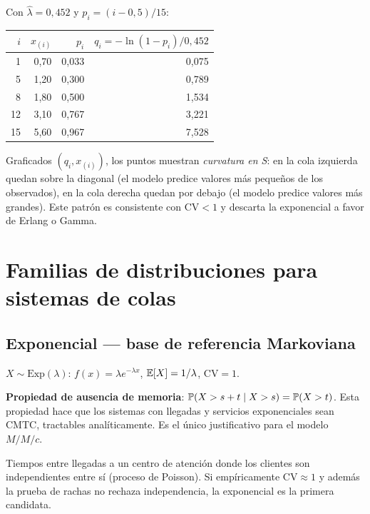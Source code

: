 \documentclass[11pt, letterpaper]{article}
\begin{document}
\begin{ejemplobox}
Con $\hat\lambda = 0{,}452$ y $p_i = (i-0{,}5)/15$:

\begin{center}\scriptsize
\renewcommand{\arraystretch}{1.15}
\begin{tabular}{rrrr}
\toprule
$i$ & $x_{(i)}$ & $p_i$ & $q_i = -\ln(1-p_i)/0{,}452$ \\
\midrule
1 & 0{,}70 & 0{,}033 & 0{,}075 \\
5 & 1{,}20 & 0{,}300 & 0{,}789 \\
8 & 1{,}80 & 0{,}500 & 1{,}534 \\
12 & 3{,}10 & 0{,}767 & 3{,}221 \\
15 & 5{,}60 & 0{,}967 & 7{,}528 \\
\bottomrule
\end{tabular}
\end{center}

Graficados $(q_i, x_{(i)})$, los puntos muestran \emph{curvatura en S}: en la cola izquierda quedan sobre la diagonal (el modelo predice valores más pequeños de los observados), en la cola derecha quedan por debajo (el modelo predice valores más grandes). Este patrón es consistente con $\mathrm{CV} < 1$ y descarta la exponencial a favor de Erlang o Gamma.
\end{ejemplobox}

\section{Familias de distribuciones para sistemas de colas}

\subsection{Exponencial --- base de referencia Markoviana}

$X \sim \text{Exp}(\lambda)$: $f(x) = \lambda e^{-\lambda x}$, $\mathbb{E}[X]=1/\lambda$, $\text{CV}=1$.

\textbf{Propiedad de ausencia de memoria}: $\mathbb{P}(X > s+t \mid X > s) = \mathbb{P}(X > t)$. Esta propiedad hace que los sistemas con llegadas y servicios exponenciales sean CMTC, tractables analíticamente. Es el único justificativo para el modelo $M/M/c$.

\begin{ejemplobox}
Tiempos entre llegadas a un centro de atención donde los clientes son independientes entre sí (proceso de Poisson). Si empíricamente $\mathrm{CV}\approx 1$ y además la prueba de rachas no rechaza independencia, la exponencial es la primera candidata.
\end{ejemplobox}
\end{document}
